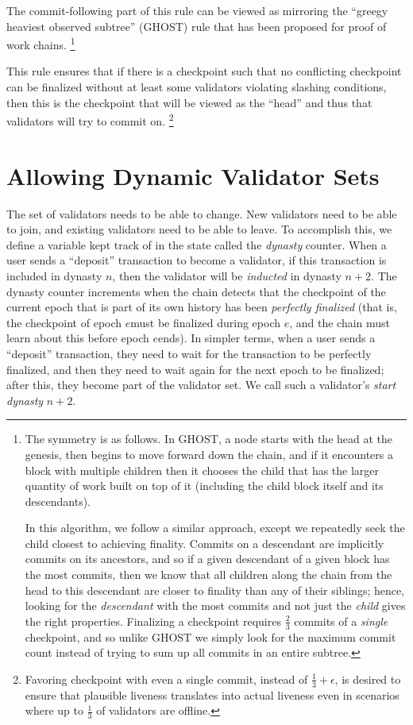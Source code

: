 \documentclass[12pt, final]{article}
\newcommand{\epoch}{\ensuremath{e}\space}
\begin{document}
The commit-following part of this rule can be viewed as mirroring the ``greegy heaviest observed subtree'' (GHOST) rule that has been proposed for proof of work chains\cite{sompolinsky2013accelerating}. \footnote{The symmetry is as follows. In GHOST, a node starts with the head at the genesis, then begins to move forward down the chain, and if it encounters a block with multiple children then it chooses the child that has the larger quantity of work built on top of it (including the child block itself and its descendants).

In this algorithm, we follow a similar approach, except we repeatedly seek the child closest to achieving finality. Commits on a descendant are implicitly commits on its ancestors, and so if a given descendant of a given block has the most commits, then we know that all children along the chain from the head to this descendant are closer to finality than any of their siblings; hence, looking for the \textit{descendant} with the most commits and not just the \textit{child} gives the right properties. Finalizing a checkpoint requires $\frac{2}{3}$ commits of a \textit{single} checkpoint, and so unlike GHOST we simply look for the maximum commit count instead of trying to sum up all commits in an entire subtree.}

This rule ensures that if there is a checkpoint such that no conflicting checkpoint can be finalized without at least some validators violating slashing conditions, then this is the checkpoint that will be viewed as the ``head'' and thus that validators will try to commit on. \footnote{Favoring checkpoint with even a single commit, instead of $\frac{1}{3} + \epsilon$, is desired to ensure that plausible liveness translates into actual liveness even in scenarios where up to $\frac{1}{3}$ of validators are offline.}

\section{Allowing Dynamic Validator Sets}
\label{sect:join_and_leave}

The set of validators needs to be able to change.  New validators need to be able to join, and existing validators need to be able to leave.  To accomplish this, we define a variable kept track of in the state called the \textit{dynasty} counter. When a user sends a ``deposit'' transaction to become a validator, if this transaction is included in dynasty $n$, then the validator will be \textit{inducted} in dynasty $n+2$. The dynasty counter increments when the chain detects that the checkpoint of the current epoch that is part of its own history has been \textit{perfectly finalized} (that is, the checkpoint of epoch \epoch must be finalized during epoch \epoch, and the chain must learn about this before epoch \epoch ends). In simpler terms, when a user sends a ``deposit'' transaction, they need to wait for the transaction to be perfectly finalized, and then they need to wait again for the next epoch to be finalized; after this, they become part of the validator set. We call such a validator's \textit{start dynasty} $n+2$.
\end{document}
